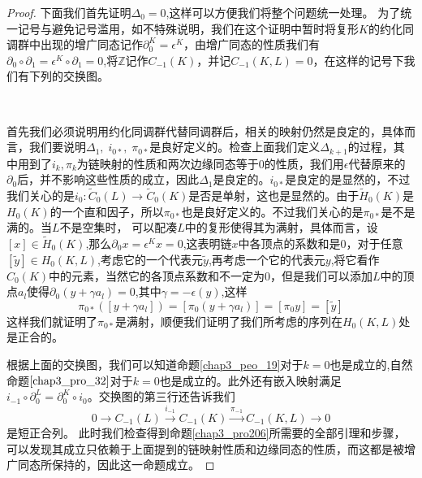 \begin{proof}
下面我们首先证明$\Delta_{0}=0$,这样可以方便我们将整个问题统一处理。
为了统一记号与避免记号滥用，如不特殊说明，我们在这个证明中暂时将复形$K$的约化同调群中出现的增广同态记作$\partial^{K}_{0}=\epsilon^{K}$，由增广同态的性质我们有$\partial_{0}\circ\partial_{1}=\epsilon^{K}\circ\partial_{1}=0$,将$\mathbb{Z}$记作$C_{-1}(K)$，并记$C_{-1}(K,L)=0$，在这样的记号下我们有下列的交换图。
{
\center
{}\\
}
首先我们必须说明用约化同调群代替同调群后，相关的映射仍然是良定的，具体而言，我们要说明$\Delta_{1},\;i_{0*},\;\pi_{0*}$是良好定义的。检查上面我们定义$\Delta_{k+1}$的过程，其中用到了$i_{k},\pi_{k}$为链映射的性质和两次边缘同态等于0的性质，我们用$\epsilon$代替原来的$\partial_{0}$后，并不影响这些性质的成立，因此$\Delta_{1}$是良定的。$i_{0*}$是良定的是显然的，不过我们关心的是$i_{0}:\tilde{C}_{0}(L)\rightarrow \tilde{C}_{0}(K)$是否是单射，这也是显然的。由于$\tilde{H}_{0}(K)$是$H_{0}(K)$的一个直和因子，所以$\pi_{0*}$也是良好定义的。不过我们关心的是$\pi_{0*}$是不是满的。当$L$不是空集时，
可以配凑$L$中的复形使得其为满射，具体而言，设$[x]\in \tilde{H}_{0}(K)$,那么$\partial_{0}x=\epsilon^{K}x=0$,这表明链$x$中各顶点的系数和是0，对于任意$[\tilde{y}]\in H_{0}(K,L)$,考虑它的一个代表元$\tilde{y}$,再考虑一个它的代表元$y$,将它看作$C_{0}(K)$中的元素，当然它的各顶点系数和不一定为0，但是我们可以添加$L$中的顶点$a_{l}$使得$\partial_{0}(y+\gamma a_{l})=0$,其中$\gamma=-\epsilon(y)$,这样$$\pi_{0*}([y+\gamma a_{l}])=[\pi_{0}(y+\gamma a_{l})]=[\pi_{0}y]=[\tilde{y}]$$
这样我们就证明了$\pi_{0*}$是满射，顺便我们证明了我们所考虑的序列在$H_{0}(K,L)$处是正合的。

根据上面的交换图，我们可以知道命题\eqref{chap3_peo_19}对于$k=0$也是成立的,自然命题$\eqref{chap3_pro_32}$对于$k=0$也是成立的。此外还有嵌入映射满足$i_{-1}\circ \partial_{0}^{L}=\partial^{K}_{0}\circ i_{0}$。交换图的第三行还告诉我们$$0\rightarrow C_{-1}(L)\xrightarrow{i_{-1}}C_{-1}(K)\xrightarrow{\pi_{-1}}C_{-1}(K,L)\rightarrow 0$$是短正合列。
此时我们检查得到命题\eqref{chap3_pro206}所需要的全部引理和步骤，可以发现其成立只依赖于上面提到的链映射性质和边缘同态的性质，而这都是被增广同态所保持的，因此这一命题成立。
\end{proof}
